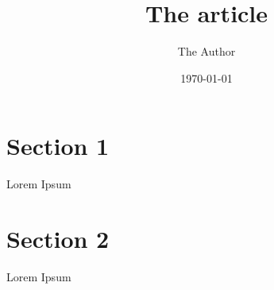 \documentclass[11pt]{article}
\title{The article}
\author{ The Author }
\date{\today}
\begin{document}
\maketitle
\pagebreak



\section{Section 1}

Lorem Ipsum


\pagebreak

\section{Section 2}

Lorem Ipsum \\

\end{document}
